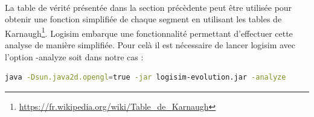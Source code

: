 \documentclass{article}
\begin{document}
    \paragraph{}
    La table de vérité présentée dans la section précèdente peut être utilisée pour obtenir une fonction simplifiée de chaque segment en utilisant les tables de Karnaugh\footnote{\url{https://fr.wikipedia.org/wiki/Table_de_Karnaugh}}.
    Logisim embarque une fonctionnalité permettant d'effectuer cette analyse de manière simplifiée.
    Pour celà il est nécessaire de lancer logisim avec l'option -analyze soit dans notre cas :

    \begin{lstlisting}[language=bash]
java -Dsun.java2d.opengl=true -jar logisim-evolution.jar -analyze
    \end{lstlisting}
\end{document}
